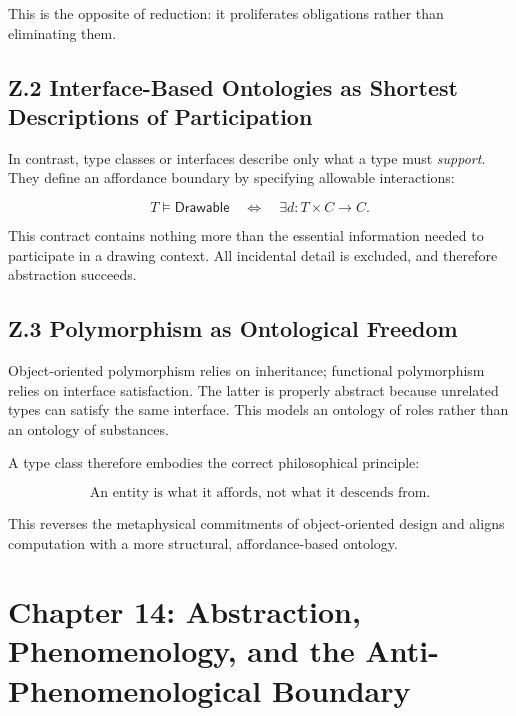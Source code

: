 \documentclass[12pt,letterpaper]{article}
\theoremstyle{remark}
\begin{document}
This is the opposite of reduction: it proliferates obligations rather than eliminating them.

\subsection{Z.2 Interface-Based Ontologies as Shortest Descriptions of Participation}

In contrast, type classes or interfaces describe only what a type must \emph{support}. They define an affordance boundary by specifying allowable interactions:

\[
T \vDash \mathsf{Drawable} \quad \iff \quad \exists d : T \times C \to C.
\]

This contract contains nothing more than the essential information needed to participate in a drawing context. All incidental detail is excluded, and therefore abstraction succeeds.

\subsection{Z.3 Polymorphism as Ontological Freedom}

Object-oriented polymorphism relies on inheritance; functional polymorphism relies on interface satisfaction. The latter is properly abstract because unrelated types can satisfy the same interface. This models an ontology of roles rather than an ontology of substances.

A type class therefore embodies the correct philosophical principle:

\[
\text{An entity is what it affords, not what it descends from.}
\]

This reverses the metaphysical commitments of object-oriented design and aligns computation with a more structural, affordance-based ontology.

\newpage

\section{Chapter 14: Abstraction, Phenomenology, and the Anti-Phenomenological Boundary}
\end{document}
